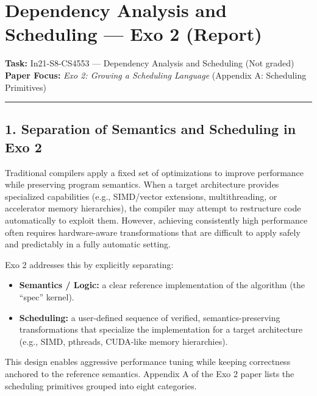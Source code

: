 

\hypertarget{dependency-analysis-and-scheduling-exo-2-report}{%
\section{Dependency Analysis and Scheduling --- Exo 2 (Report)}\label{dependency-analysis-and-scheduling-exo-2-report}}

\textbf{Task:} In21-S8-CS4553 --- Dependency Analysis and Scheduling (Not graded)\\
\textbf{Paper Focus:} \emph{Exo 2: Growing a Scheduling Language} (Appendix A: Scheduling Primitives)

\begin{center}\rule{0.5\linewidth}{0.5pt}\end{center}

\hypertarget{the-separation-of-semantics-and-scheduling-in-exo-2}{%
\subsection{1. Separation of Semantics and Scheduling in Exo 2}\label{the-separation-of-semantics-and-scheduling-in-exo-2}}

Traditional compilers apply a fixed set of optimizations to improve performance while preserving program semantics. When a target architecture provides specialized capabilities (e.g., SIMD/vector extensions, multithreading, or accelerator memory hierarchies), the compiler may attempt to restructure code automatically to exploit them. However, achieving consistently high performance often requires hardware-aware transformations that are difficult to apply safely and predictably in a fully automatic setting.

Exo 2 addresses this by explicitly separating:
\begin{itemize}
  \item \textbf{Semantics / Logic:} a clear reference implementation of the algorithm (the ``spec'' kernel).
  \item \textbf{Scheduling:} a user-defined sequence of verified, semantics-preserving transformations that specialize the implementation for a target architecture (e.g., SIMD, pthreads, CUDA-like memory hierarchies).
\end{itemize}

This design enables aggressive performance tuning while keeping correctness anchored to the reference semantics. Appendix A of the Exo 2 paper lists the scheduling primitives grouped into eight categories.

